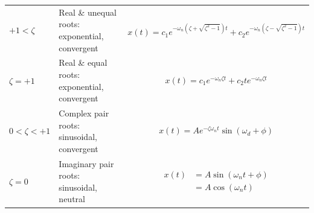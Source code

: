 \documentclass[
]{book}
\begin{document}
\begin{longtable}[]{@{}lll@{}}
\toprule
\endhead
\begin{minipage}[t]{0.13\columnwidth}\raggedright
\(+1 < \zeta\)\strut
\end{minipage} & \begin{minipage}[t]{0.39\columnwidth}\raggedright
Real \& unequal roots: exponential, convergent\strut
\end{minipage} & \begin{minipage}[t]{0.39\columnwidth}\raggedright
\[ x\left(t\right) = c_1 e^{-\omega_n \left( \zeta + \sqrt{\zeta^2 - 1} \right)t} + c_2 e^{-\omega_n \left( \zeta - \sqrt{\zeta^2 - 1} \right)t} \]\strut
\end{minipage}\tabularnewline
\begin{minipage}[t]{0.13\columnwidth}\raggedright
\(\zeta = +1\)\strut
\end{minipage} & \begin{minipage}[t]{0.39\columnwidth}\raggedright
Real \& equal roots: exponential, convergent\strut
\end{minipage} & \begin{minipage}[t]{0.39\columnwidth}\raggedright
\[ x\left(t\right) = c_1 e^{-\omega_n \zeta t} + c_2 t e^{-\omega_n \zeta t} \]\strut
\end{minipage}\tabularnewline
\begin{minipage}[t]{0.13\columnwidth}\raggedright
\(0 < \zeta < +1\)\strut
\end{minipage} & \begin{minipage}[t]{0.39\columnwidth}\raggedright
Complex pair roots: sinusoidal, convergent\strut
\end{minipage} & \begin{minipage}[t]{0.39\columnwidth}\raggedright
\[ x\left(t\right) =  A e^{-\zeta \omega_n t} \sin \left( \omega_d + \phi \right) \]\strut
\end{minipage}\tabularnewline
\begin{minipage}[t]{0.13\columnwidth}\raggedright
\(\zeta = 0\)\strut
\end{minipage} & \begin{minipage}[t]{0.39\columnwidth}\raggedright
Imaginary pair roots: sinusoidal, neutral\strut
\end{minipage} & \begin{minipage}[t]{0.39\columnwidth}\raggedright
\begin{align} x\left(t\right) &=  A \sin \left( \omega_n t + \phi \right) \\ &= A \cos \left( \omega_n t \right) \end{align}\strut

\end{minipage}
\end{longtable}
\end{document}
